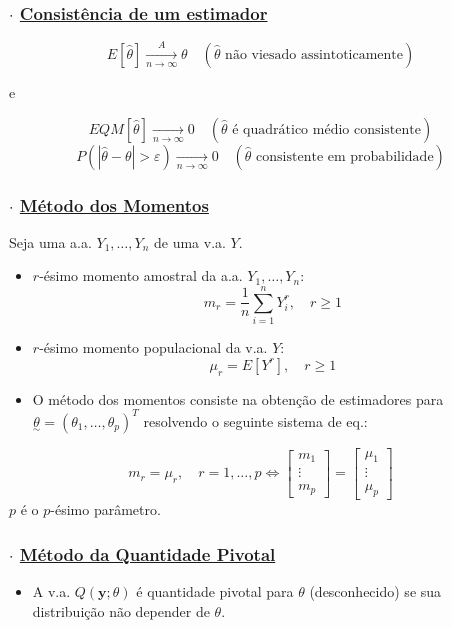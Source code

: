 \documentclass[11pt,a4paper]{article}
\newcommand{\vt}[1]{\underset{\sim}{#1}}      %
\begin{document}
\subsubsection*{$\cdot$ \underline{Consistência de um estimador}}
\[ E[\hat{\theta}] \xrightarrow[n\to\infty]{A} \theta \quad (\hat{\theta} \text{ não viesado assintoticamente}) \]
\begin{center} e \end{center}
\[ EQM[\hat{\theta}] \xrightarrow[n\to\infty]{} 0 \quad (\hat{\theta} \text{ é quadrático médio consistente}) \]
\[ P(|\hat{\theta}-\theta|>\varepsilon) \xrightarrow[n\to\infty]{} 0 \quad (\hat{\theta} \text{ consistente em probabilidade}) \]

\subsubsection*{$\cdot$ \underline{Método dos Momentos}}
Seja uma a.a. $Y_1,\ldots,Y_n$ de uma v.a. $Y$.
\begin{itemize}
  \item $r$-ésimo momento amostral da a.a. $Y_1,\ldots,Y_n$:
  \[ m_r = \frac{1}{n}\sum_{i=1}^{n} Y_i^r,\quad r\geq 1 \]
  \item $r$-ésimo momento populacional da v.a. $Y$:
  \[ \mu_r = E[Y^r],\quad r\geq 1 \]
  \item O método dos momentos consiste na obtenção de estimadores para $\vt{\theta} = (\theta_1,\ldots,\theta_p)^T$ resolvendo o seguinte sistema de eq.:
\end{itemize}
\[ m_r = \mu_r,\quad r=1,\ldots,p \iff
\begin{bmatrix} m_1 \\ \vdots \\ m_p \end{bmatrix} =
\begin{bmatrix} \mu_1 \\ \vdots \\ \mu_p \end{bmatrix} \]
$p$ é o $p$-ésimo parâmetro.

\subsubsection*{$\cdot$ \underline{Método da Quantidade Pivotal}}
\begin{itemize}
  \item A v.a. $Q(\mathbf{y};\theta)$ é quantidade pivotal para $\theta$ (desconhecido) se sua distribuição não depender de $\theta$.
\end{itemize}
\end{document}
